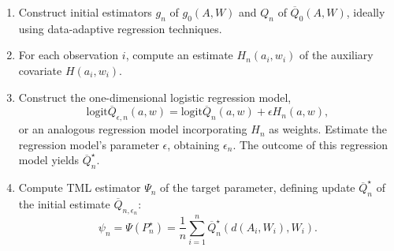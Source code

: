 \documentclass[
  12pt, krantz2,
]{krantz}
\providecommand{\tightlist}{%
  \setlength{\itemsep}{0pt}\setlength{\parskip}{0pt}}
\newcommand{\1}{\mathbbm{1}}
\theoremstyle{definition}
\theoremstyle{definition}
\theoremstyle{definition}
\theoremstyle{definition}
\theoremstyle{remark}
\begin{document}
\begin{enumerate}
\def\labelenumi{\arabic{enumi}.}
\tightlist
\item
  Construct initial estimators \(g_n\) of \(g_0(A, W)\) and \(Q_n\) of
  \(\overline{Q}_0(A, W)\), ideally using data-adaptive regression techniques.
\item
  For each observation \(i\), compute an estimate \(H_n(a_i, w_i)\) of the
  auxiliary covariate \(H(a_i,w_i)\).
\item
  Construct the one-dimensional logistic regression model,
  \[ \text{logit}\overline{Q}_{\epsilon, n}(a, w) =
  \text{logit}\overline{Q}_n(a, w) + \epsilon H_n(a, w),\]
  or an analogous regression model incorporating \(H_n\) as weights. Estimate the
  regression model's parameter \(\epsilon\), obtaining \(\epsilon_n\). The outcome
  of this regression model yields \(\overline{Q}_n^{\star}\).
\item
  Compute TML estimator \(\Psi_n\) of the target parameter, defining update
  \(\overline{Q}_n^{\star}\) of the initial estimate
  \(\overline{Q}_{n, \epsilon_n}\):
  \begin{equation}
    \psi_n = \Psi(P_n^{\star}) = \frac{1}{n} \sum_{i = 1}^n
    \overline{Q}_n^{\star}(d(A_i, W_i), W_i).
    \label{eq:tmle}
  \end{equation}
\end{enumerate}
\end{document}

